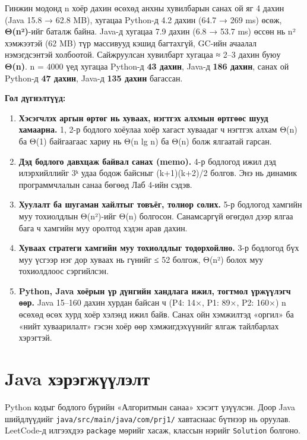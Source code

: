 \documentclass[11pt,a4paper]{article}
\begin{document}
Гинжин модонд n хоёр дахин өсөхөд анхны хувилбарын санах ой яг 4 дахин (Java 15.8 → 62.8 MB), хугацаа Python-д 4.2 дахин (64.7 → 269 ms) өсөж, \textbf{Θ(n²)}-ийг баталж байна. Java-д хугацаа 7.9 дахин (6.8 → 53.7 ms) өссөн нь n² хэмжээтэй (62 MB) түр массивууд кэшид багтахгүй, GC-ийн ачаалал нэмэгдсэнтэй холбоотой. Сайжруулсан хувилбарт хугацаа ≈ 2–3 дахин буюу \textbf{Θ(n)}. n = 4000 үед хугацаа Python-д \textbf{43 дахин}, Java-д \textbf{186 дахин}, санах ой Python-д \textbf{47 дахин}, Java-д \textbf{135 дахин} багассан.

\textbf{Гол дүгнэлтүүд:}

\begin{enumerate}
\item \textbf{Хэсэгчлэх аргын өртөг нь хуваах, нэгтгэх алхмын өртгөөс шууд хамаарна.} 1, 2-р бодлого хоёулаа хоёр хагаст хуваадаг ч нэгтгэх алхам Θ(n) ба Θ(1) байгаагаас хариу нь Θ(n lg n) ба Θ(n) болж ялгаатай гарсан.
\item \textbf{Дэд бодлого давхцаж байвал санах (memo).} 4-р бодлогод ижил дэд илэрхийллийг 3ᵏ удаа бодож байсныг (k+1)(k+2)/2 болгов. Энэ нь динамик программчлалын санаа бөгөөд Лаб 4-ийн сэдэв.
\item \textbf{Хуулалт ба шугаман хайлтыг товъёг, толиор солих.} 5-р бодлогод хамгийн муу тохиолдлын Θ(n²)-ийг Θ(n) болгосон. Санамсаргүй өгөгдөл дээр ялгаа бага ч хамгийн муу оролтод хэдэн арав дахин.
\item \textbf{Хуваах стратеги хамгийн муу тохиолдлыг тодорхойлно.} 3-р бодлогод бүх муу үсгээр нэг дор хуваах нь гүнийг ≤ 52 болгож, Θ(n²) болох муу тохиолдлоос сэргийлсэн.
\item \textbf{Python, Java хоёрын үр дүнгийн хандлага ижил, тогтмол үржүүлэгч өөр.} Java 15–160 дахин хурдан байсан ч (P4: 14×, P1: 89×, P2: 160×) n өсөхөд өсөх хурд хоёр хэлэнд ижил байв. Санах ойн хэмжилтэд «оргил» ба «нийт хуваарилалт» гэсэн хоёр өөр хэмжигдэхүүнийг ялгаж тайлбарлах хэрэгтэй.
\end{enumerate}

\appendix
\clearpage
\section{Java хэрэгжүүлэлт}
Python кодыг бодлого бүрийн «Алгоритмын санаа» хэсэгт үзүүлсэн. Доор Java шийдлүүдийг \texttt{java/\allowbreak{}src/\allowbreak{}main/\allowbreak{}java/\allowbreak{}com/\allowbreak{}prj1/} хавтаснаас бүтнээр нь оруулав. LeetCode-д илгээхдээ \texttt{package} мөрийг хасаж, классын нэрийг \texttt{Solution} болгоно.
\end{document}

